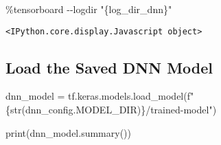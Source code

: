 \documentclass[
  letterpaper,
  DIV=11,
  numbers=noendperiod]{scrreprt}
\newenvironment{Shaded}{\begin{snugshade}}{\end{snugshade}}
\newcommand{\BuiltInTok}[1]{\textcolor[rgb]{0.00,0.23,0.31}{#1}}
\newcommand{\NormalTok}[1]{\textcolor[rgb]{0.00,0.23,0.31}{#1}}
\newcommand{\OperatorTok}[1]{\textcolor[rgb]{0.37,0.37,0.37}{#1}}
\newcommand{\SpecialCharTok}[1]{\textcolor[rgb]{0.37,0.37,0.37}{#1}}
\newcommand{\SpecialStringTok}[1]{\textcolor[rgb]{0.13,0.47,0.30}{#1}}
\newcommand{\StringTok}[1]{\textcolor[rgb]{0.13,0.47,0.30}{#1}}
\begin{document}
\begin{Shaded}
\begin{Highlighting}[]
\OperatorTok{\%}\NormalTok{tensorboard }\OperatorTok{{-}{-}}\NormalTok{logdir }\StringTok{"}\SpecialCharTok{\{log\_dir\_dnn\}}\StringTok{"}
\end{Highlighting}
\end{Shaded}

\begin{verbatim}
<IPython.core.display.Javascript object>
\end{verbatim}

\subsection{Load the Saved DNN Model}\label{load-the-saved-dnn-model}

\begin{Shaded}
\begin{Highlighting}[]
\NormalTok{dnn\_model }\OperatorTok{=}\NormalTok{ tf.keras.models.load\_model(}\SpecialStringTok{f"}\SpecialCharTok{\{}\BuiltInTok{str}\NormalTok{(dnn\_config.MODEL\_DIR)}\SpecialCharTok{\}}\SpecialStringTok{/trained{-}model"}\NormalTok{)}
\end{Highlighting}
\end{Shaded}

\begin{Shaded}
\begin{Highlighting}[]
\BuiltInTok{print}\NormalTok{(dnn\_model.summary())}
\end{Highlighting}
\end{Shaded}
\end{document}
